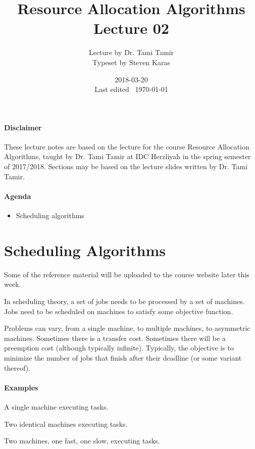\documentclass{idc_msc}
\title{Resource Allocation Algorithms\\\large Lecture 02}
\date{2018-03-20 \\ Last edited \currenttime\ \today}
\author{Lecture by Dr. Tami Tamir\\Typeset by Steven Karas}
\begin{document}
\maketitle

\paragraph{Disclaimer}

These lecture notes are based on the lecture for the course Resource Allocation Algorithms, taught by Dr. Tami Tamir at IDC Herzliyah in the spring semester of 2017/2018.
Sections may be based on the lecture slides written by Dr. Tami Tamir.

\paragraph{Agenda}

\begin{itemize}
  \item Scheduling algorithms
\end{itemize}

\section{Scheduling Algorithms}

\nocite{karger1997scheduling}
\nocite{pinedo2016scheduling}
\nocite{brucker2007scheduling}

Some of the reference material will be uploaded to the course website later this week.

In scheduling theory, a set of jobs needs to be processed by a set of machines.
Jobs need to be scheduled on machines to satisfy some objective function.

Problems can vary, from a single machine, to multiple machines, to asymmetric machines.
Sometimes there is a transfer cost. Sometimes there will be a preemption cost (although typically infinite).
Typically, the objective is to minimize the number of jobs that finish after their deadline (or some variant thereof).

\paragraph{Examples}

A single machine executing tasks.

Two identical machines executing tasks.

Two machines, one fast, one slow, executing tasks.
\end{document}
